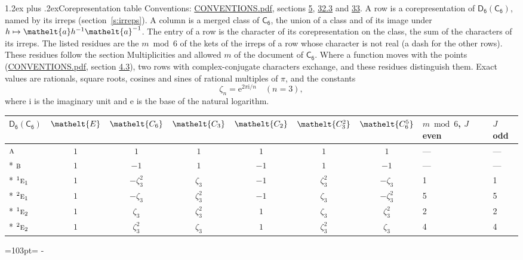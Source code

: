 \documentclass[10pt,a4paper]{article}
\makeatletter
\renewcommand\section{\@startsection{section}{1}{\z@}{-3ex plus -1ex minus -.2ex}%
  {1.2ex plus .2ex}{\normalfont\large\sffamily\bfseries\color{parttitle}}}
\newcommand{\needspace}[1]{\par\penalty-100\begingroup\dimen0=#1\relax\dimen2=\pagegoal
  \advance\dimen2-\pagetotal\ifdim\dimen0>\dimen2\relax\ifdim\dimen2>0pt\vfil\break\fi\fi
  \endgroup}
\numberwithin{equation}{section}
\newcommand{\eltfont}[1]{{\let\sigma\eltsigma\mathelt{#1}}}
\newcommand{\grp}[1]{\mathsf{#1}}
\newcommand{\irr}[1]{\text{\normalfont\scshape #1}}
\newcommand{\conjpair}[1]{{}^{#1}}
\newcommand{\cls}[1]{\eltfont{#1}}
\newcommand{\elt}[1]{\eltfont{#1}}
\newcommand{\iunit}{\mathrm{i}}
\newcommand{\expe}{\mathrm{e}}
\newcommand{\rootunity}[1]{\zeta_{#1}}
\makeatother
\begin{document}
\section{Corepresentation table}\label{s:character_table}
Conventions: \href{../../CONVENTIONS.pdf}{CONVENTIONS.pdf}, sections \href{../../../rotation/CONVENTIONS.pdf\#conv.5}{5}, \href{../../CONVENTIONS.pdf\#conv.32.3}{32.3} and \href{../../CONVENTIONS.pdf\#conv.33}{33}.
A row is a corepresentation of $\grp{D_{6}}(\grp{C_{6}})$, named by its irreps (section~\ref{s:irreps}). A column is a merged class of $\grp{C_{6}}$, the union of a class and of its image under $h \mapsto \elt{a} h^{-1} \elt{a}^{-1}$. The entry of a row is the character of its corepresentation on the class, the sum of the characters of its irreps.
\leavevmode\label{n:head.parity}The listed residues are the $m \bmod 6$ of the kets of the irreps of a row whose character is not real (a dash for the other rows). These residues follow the section Multiplicities and allowed $m$ of the document of \href{../../../rotation/data/pdf/C6.pdf}{$\grp{C_{6}}$}. Where a function moves with the points (\href{../../CONVENTIONS.pdf}{CONVENTIONS.pdf}, section \href{../../../rotation/CONVENTIONS.pdf\#conv.4.3}{4.3}), two rows with complex-conjugate characters exchange, and these residues distinguish them.
\leavevmode\label{n:constant.root}\label{n:index.root.order}Exact values are rationals, square roots, cosines and sines of rational multiples of $\pi$, and the constants
\begin{equation}\label{e:constants}\rootunity{n} = \expe^{2\pi\iunit/n}\quad(n = 3),\end{equation}
where $\iunit$ is the imaginary unit and $\expe$ is the base of the natural logarithm.
{\small\setlength{\tabcolsep}{4pt}\begin{longtable}{@{}lccccccll@{}}\toprule
$\grp{D_{6}}(\grp{C_{6}})$ & $\cls{E}$ & $\cls{C_{6}}$ & $\cls{C_{3}}$ & $\cls{C_{2}}$ & $\cls{C_{3}^{2}}$ & $\cls{C_{6}^{5}}$ & $m \bmod 6$, $J$ even & $J$ odd\\\midrule\endhead
\bottomrule\endfoot\endlastfoot
$\irr{a}$ & $1$ & $1$ & $1$ & $1$ & $1$ & $1$ & --- & ---\\*
$\irr{b}$ & $1$ & $-1$ & $1$ & $-1$ & $1$ & $-1$ & --- & ---\\*
$\conjpair{1}\irr{e}_{1}$ & $1$ & $-\rootunity{3}^{2}$ & $\rootunity{3}$ & $-1$ & $\rootunity{3}^{2}$ & $-\rootunity{3}$ & 1 & 1\\*
$\conjpair{2}\irr{e}_{1}$ & $1$ & $-\rootunity{3}$ & $\rootunity{3}^{2}$ & $-1$ & $\rootunity{3}$ & $-\rootunity{3}^{2}$ & 5 & 5\\*
$\conjpair{1}\irr{e}_{2}$ & $1$ & $\rootunity{3}$ & $\rootunity{3}^{2}$ & $1$ & $\rootunity{3}$ & $\rootunity{3}^{2}$ & 2 & 2\\*
$\conjpair{2}\irr{e}_{2}$ & $1$ & $\rootunity{3}^{2}$ & $\rootunity{3}$ & $1$ & $\rootunity{3}^{2}$ & $\rootunity{3}$ & 4 & 4\\
\bottomrule\end{longtable}}
\needspace{103pt}
\end{document}
